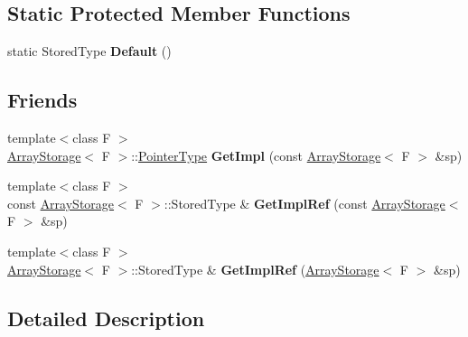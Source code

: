 \subsection*{Static Protected Member Functions}
\begin{DoxyCompactItemize}
\item 
\hypertarget{classLoki_1_1ArrayStorage_a4a5baef054fee793bb0259ed546f8fa5}{}static Stored\+Type {\bfseries Default} ()\label{classLoki_1_1ArrayStorage_a4a5baef054fee793bb0259ed546f8fa5}

\end{DoxyCompactItemize}
\subsection*{Friends}
\begin{DoxyCompactItemize}
\item 
\hypertarget{classLoki_1_1ArrayStorage_a2084157f4f3cd792f7ba1ed0b65a1e34}{}{\footnotesize template$<$class F $>$ }\\\hyperlink{classLoki_1_1ArrayStorage}{Array\+Storage}$<$ F $>$\+::\hyperlink{classLoki_1_1ArrayStorage_ac1c79b615bc1bfffe6b8b8a4c17ff71a}{Pointer\+Type} {\bfseries Get\+Impl} (const \hyperlink{classLoki_1_1ArrayStorage}{Array\+Storage}$<$ F $>$ \&sp)\label{classLoki_1_1ArrayStorage_a2084157f4f3cd792f7ba1ed0b65a1e34}

\item 
\hypertarget{classLoki_1_1ArrayStorage_af602c886d85a281b6006f85256ce5dde}{}{\footnotesize template$<$class F $>$ }\\const \hyperlink{classLoki_1_1ArrayStorage}{Array\+Storage}$<$ F $>$\+::Stored\+Type \& {\bfseries Get\+Impl\+Ref} (const \hyperlink{classLoki_1_1ArrayStorage}{Array\+Storage}$<$ F $>$ \&sp)\label{classLoki_1_1ArrayStorage_af602c886d85a281b6006f85256ce5dde}

\item 
\hypertarget{classLoki_1_1ArrayStorage_a8b53b9469c45940ea32d7e9028074c9b}{}{\footnotesize template$<$class F $>$ }\\\hyperlink{classLoki_1_1ArrayStorage}{Array\+Storage}$<$ F $>$\+::Stored\+Type \& {\bfseries Get\+Impl\+Ref} (\hyperlink{classLoki_1_1ArrayStorage}{Array\+Storage}$<$ F $>$ \&sp)\label{classLoki_1_1ArrayStorage_a8b53b9469c45940ea32d7e9028074c9b}

\end{DoxyCompactItemize}


\subsection{Detailed Description}
